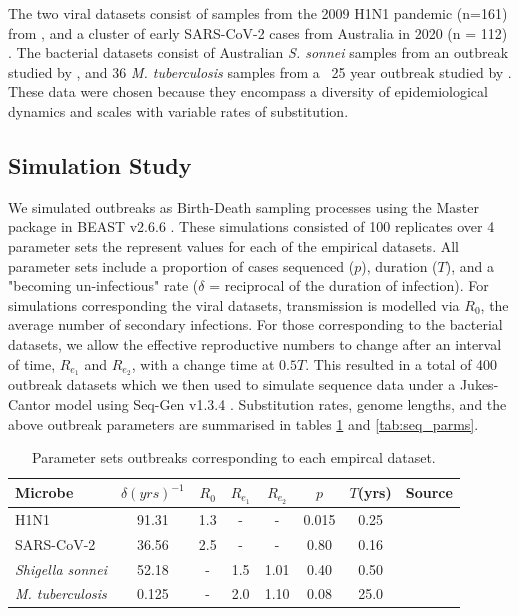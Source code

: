 \documentclass{article}
\begin{document}
\begin{spacing}{1.5}
The two viral datasets consist of samples from the 2009 H1N1 pandemic (n=161) from \citet{hedge_2013_real-time}, and a cluster of early SARS-CoV-2 cases from  Australia in 2020 (n = 112) \citep{lane2021genomics}. The bacterial datasets consist of Australian \textit{S. sonnei} samples from an outbreak studied by \citet{ingle_co-circulation_2019}, and 36 \textit{M. tuberculosis} samples from a ~25 year outbreak studied by \citet{kuhnert_tuberculosis_2018}. These data were chosen because they encompass a diversity of epidemiological dynamics and scales with variable rates of substitution.

\subsection*{Simulation Study}
We simulated outbreaks as Birth-Death sampling processes using the Master package in BEAST v2.6.6 \citep{vaughan_stochastic_2013,bouckaert_beast_2019}. These simulations consisted of 100 replicates over 4 parameter sets the represent values for each of the empirical datasets. All parameter sets include a proportion of cases sequenced ($p$), duration ($T$), and a "becoming un-infectious" rate ($\delta$ = reciprocal of the duration of infection). For simulations corresponding the viral datasets, transmission is modelled via $R_0$, the average number of secondary infections. For those corresponding to the bacterial datasets, we allow the effective reproductive numbers to change after an interval of time, $R_{e_1}$ and $R_{e_2}$, with a change time at $0.5T$. This resulted in a total of 400 outbreak datasets which we then used to simulate sequence data under a Jukes-Cantor model using Seq-Gen v1.3.4 \citep{rambaut_seq-gen_1997}. Substitution rates, genome lengths, and the above outbreak parameters are summarised in tables \ref{tab:sim_parms} and \ref{tab:seq_parms}.

\begin{table}[ht]
    \centering
    \caption{Parameter sets outbreaks corresponding to each empircal dataset.}
    \begin{tabular}{l|c|c|c|c|c|c|l|}
    \hline
    Microbe                     &   $\delta (yrs)^{-1}$    & $R_0$ &   $R_{e_1}$   &  $R_{e_2}$    &   $p$   &   $T$(yrs)   & Source \\
    \hline
    H1N1                        &   91.31    & 1.3 &   -   &  -    &   0.015   &   0.25 & \citet{hedge_2013_real-time} \\
    SARS-CoV-2                  &   36.56    & 2.5 &   -   &  -   &   0.80   &  0.16 & \citet{lane2021genomics} \\
    \textit{Shigella sonnei}    &   52.18    &  - &   1.5   &  1.01   &   0.40   &   0.50 & \citet{ingle_co-circulation_2019} \\
    \textit{M. tuberculosis}    &   0.125    &  - &   2.0   &  1.10    &   0.08   &   25.0 & \citet{kuhnert_tuberculosis_2018} \\
    \hline
    \end{tabular}
    \label{tab:sim_parms}
\end{table}


\end{spacing}
\end{document}
